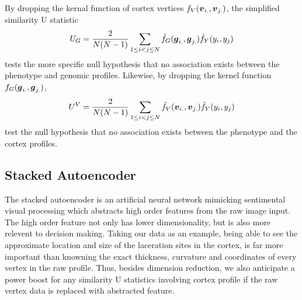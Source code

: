 {By dropping the kernal function of cortex vertices $f_V(\boldsymbol{v}_{i.}, \boldsymbol{v}_{j.})$, the simplified similarity U statistic
\[ U_G = \frac{2}{N(N-1)} \sum_{1 \leq i < j \leq N}^{} \tilde{f}_G(\boldsymbol{g}_{i.}, \boldsymbol{g}_{j.}) \tilde{f}_Y(y_i, y_j) \]
tests the more specific null hypothesis that no association exists between the phenotype and genomic profiles. Likewise, by dropping the kernel function $f_G(\boldsymbol{g}_{i.}, \boldsymbol{g}_{j.})$, 
\[ U^V = \frac{2}{N(N-1)} \sum_{1 \leq i < j \leq N}^{} \tilde{f}_V(\boldsymbol{v}_{i.}, \boldsymbol{v}_{j.}) \tilde{f}_Y(y_i, y_j) \]
test the null hypothesis that no association exists between the phenotype and the cortex profiles.

\subsection{Stacked Autoencoder}
The stacked autoencoder is an artificial neural network mimicking sentimental visual processing which abstracts high order features from the raw image input. The high order feature not only has lower dimensionality, but is also more relevent to decision making. Taking our data as an example, being able to see the approximate location and size of the laceration sites in the cortex, is far more important than knowning the exact thickness, curvature and coordinates of every vertex in the raw profile. Thus, besides dimension reduction, we also anticipate a power boost for any similarity U statistics involving cortex profile if the raw vertex data is replaced with abstracted feature.

}
